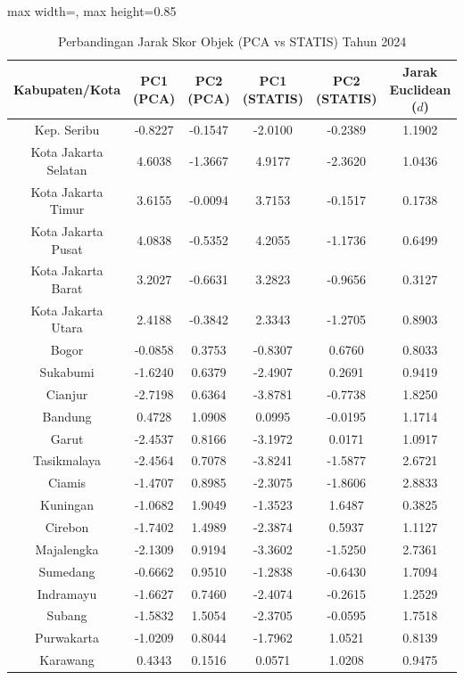 \begin{table}[H]
\centering
\caption{Perbandingan Jarak Skor Objek (PCA vs STATIS) Tahun 2024} \label{tab:app1jarak_skor_2024}
\begin{adjustbox}{max width=\textwidth, max height=0.85\textheight}
\begin{tabular}{|c|c|c|c|c|c|}
\hline
\textbf{Kabupaten/Kota} & \textbf{PC1 (PCA)} & \textbf{PC2 (PCA)} & \textbf{PC1 (STATIS)} & \textbf{PC2 (STATIS)} & \textbf{Jarak Euclidean ($d$)} \\
\hline
Kep. Seribu & -0.8227 & -0.1547 & -2.0100 & -0.2389 & 1.1902 \\
Kota Jakarta Selatan & 4.6038 & -1.3667 & 4.9177 & -2.3620 & 1.0436 \\
Kota Jakarta Timur & 3.6155 & -0.0094 & 3.7153 & -0.1517 & 0.1738 \\
Kota Jakarta Pusat & 4.0838 & -0.5352 & 4.2055 & -1.1736 & 0.6499 \\
Kota Jakarta Barat & 3.2027 & -0.6631 & 3.2823 & -0.9656 & 0.3127 \\
Kota Jakarta Utara & 2.4188 & -0.3842 & 2.3343 & -1.2705 & 0.8903 \\
Bogor & -0.0858 & 0.3753 & -0.8307 & 0.6760 & 0.8033 \\
Sukabumi & -1.6240 & 0.6379 & -2.4907 & 0.2691 & 0.9419 \\
Cianjur & -2.7198 & 0.6364 & -3.8781 & -0.7738 & 1.8250 \\
Bandung & 0.4728 & 1.0908 & 0.0995 & -0.0195 & 1.1714 \\
Garut & -2.4537 & 0.8166 & -3.1972 & 0.0171 & 1.0917 \\
Tasikmalaya & -2.4564 & 0.7078 & -3.8241 & -1.5877 & 2.6721 \\
Ciamis & -1.4707 & 0.8985 & -2.3075 & -1.8606 & 2.8833 \\
Kuningan & -1.0682 & 1.9049 & -1.3523 & 1.6487 & 0.3825 \\
Cirebon & -1.7402 & 1.4989 & -2.3874 & 0.5937 & 1.1127 \\
Majalengka & -2.1309 & 0.9194 & -3.3602 & -1.5250 & 2.7361 \\
Sumedang & -0.6662 & 0.9510 & -1.2838 & -0.6430 & 1.7094 \\
Indramayu & -1.6627 & 0.7460 & -2.4074 & -0.2615 & 1.2529 \\
Subang & -1.5832 & 1.5054 & -2.3705 & -0.0595 & 1.7518 \\
Purwakarta & -1.0209 & 0.8044 & -1.7962 & 1.0521 & 0.8139 \\
Karawang & 0.4343 & 0.1516 & 0.0571 & 1.0208 & 0.9475 \\

\end{tabular}
\end{adjustbox}
\end{table}

